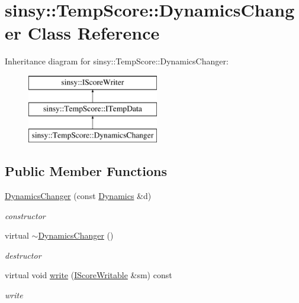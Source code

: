 \hypertarget{classsinsy_1_1TempScore_1_1DynamicsChanger}{\section{sinsy\-:\-:\-Temp\-Score\-:\-:\-Dynamics\-Changer \-Class \-Reference}
\label{classsinsy_1_1TempScore_1_1DynamicsChanger}
}
\-Inheritance diagram for sinsy\-:\-:\-Temp\-Score\-:\-:\-Dynamics\-Changer\-:\begin{figure}[H]
\begin{center}
\leavevmode
\includegraphics[height=3.000000cm]{classsinsy_1_1TempScore_1_1DynamicsChanger}
\end{center}
\end{figure}
\subsection*{\-Public \-Member \-Functions}
\begin{DoxyCompactItemize}
\item 
\hypertarget{classsinsy_1_1TempScore_1_1DynamicsChanger_ad74998ee8cf95add7660c1bf8e93dab7}{\hyperlink{classsinsy_1_1TempScore_1_1DynamicsChanger_ad74998ee8cf95add7660c1bf8e93dab7}{\-Dynamics\-Changer} (const \hyperlink{classsinsy_1_1Dynamics}{\-Dynamics} \&d)}\label{classsinsy_1_1TempScore_1_1DynamicsChanger_ad74998ee8cf95add7660c1bf8e93dab7}

\begin{DoxyCompactList}\small\item\em constructor \end{DoxyCompactList}\item 
\hypertarget{classsinsy_1_1TempScore_1_1DynamicsChanger_a073ec1a92e0b47c5139651729c3c4b82}{virtual \hyperlink{classsinsy_1_1TempScore_1_1DynamicsChanger_a073ec1a92e0b47c5139651729c3c4b82}{$\sim$\-Dynamics\-Changer} ()}\label{classsinsy_1_1TempScore_1_1DynamicsChanger_a073ec1a92e0b47c5139651729c3c4b82}

\begin{DoxyCompactList}\small\item\em destructor \end{DoxyCompactList}\item 
\hypertarget{classsinsy_1_1TempScore_1_1DynamicsChanger_ab55f77f5d4554919a2c3b76c51d8f486}{virtual void \hyperlink{classsinsy_1_1TempScore_1_1DynamicsChanger_ab55f77f5d4554919a2c3b76c51d8f486}{write} (\hyperlink{classsinsy_1_1IScoreWritable}{\-I\-Score\-Writable} \&sm) const }\label{classsinsy_1_1TempScore_1_1DynamicsChanger_ab55f77f5d4554919a2c3b76c51d8f486}

\begin{DoxyCompactList}\small\item\em write \end{DoxyCompactList}\end{DoxyCompactItemize}



